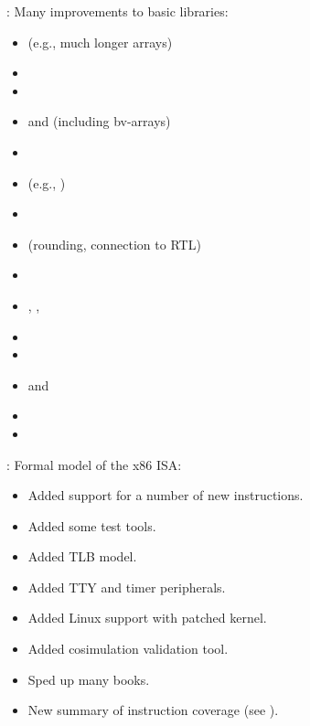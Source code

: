 \begin{frame}

\implibtitle

:
Many improvements to basic libraries:
\begin{itemize}
\item {} (e.g., much longer arrays)
\item {}
\item {}
\item {} and  (including bv-arrays)
\item {}
\item {} (e.g., )
\item {}
\item {} (rounding, connection to RTL)
\item {}
\item {}, , 
\item {}
\item {}
\item {} and 
\item {}
\item {}

\end{itemize}

\end{frame}


\begin{frame}

\implibtitle

:
Formal model of the x86 ISA:
\begin{itemize}
\item Added support for a number of new instructions.
\item Added some test tools.
\item Added TLB model.
\item Added TTY and timer peripherals.
\item Added Linux support with patched kernel.
\item Added cosimulation validation tool.
\item Sped up many books.
\item New summary of instruction coverage
      (see ).
\end{itemize}

\end{frame}



